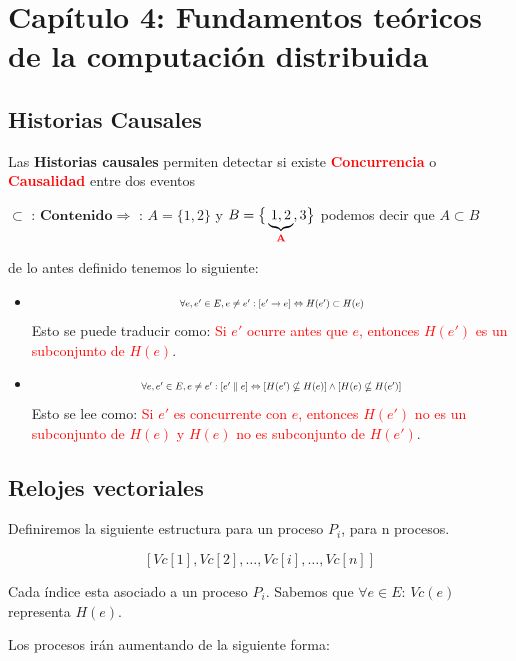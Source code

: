 \section{Capítulo 4: Fundamentos teóricos de la computación distribuida}
\subsection{Historias Causales}
Las \textbf{Historias causales} permiten detectar si existe \textcolor{red}{\textbf{Concurrencia}} o \textcolor{red}{\textbf{Causalidad}} entre dos eventos

{
\tiny\noindent\centering
$\subset \text{ : } \textbf{Contenido} \Rightarrow \text{ : } A=\{1,2\}$ y 
$B=\big\{\underbrace{1,2}_{\text{\textcolor{red}{\textbf{A}}}},3\big\}$ podemos decir que $A \subset B$
\par
}

de lo antes definido tenemos lo siguiente:

\begin{itemize}

    \item 
    \[\textstyle
    \scalebox{0.70}{$\forall e, e' \in E, e \neq e' : [e' \rightarrow e] \Leftrightarrow H(e') \subset H(e)$}
    \]
    Esto se puede traducir como: \textcolor{red}{Si $e'$ ocurre antes que $e$, entonces $H(e')$ es un subconjunto de $H(e)$}.

    \item 
    \[\textstyle
    \scalebox{0.70}{$\forall e, e' \in E, e \neq e' : [e' \parallel e] \Leftrightarrow [H(e') \nsubseteq H(e)] \land [H(e) \nsubseteq H(e') ]$}
    \]
    Esto se lee como: \textcolor{red}{Si $e'$ es concurrente con $e$, entonces $H(e')$ no es un subconjunto de $H(e)$ y $H(e)$ no es subconjunto de $H(e')$}.

\end{itemize}


\subsection{Relojes vectoriales}
Definiremos la siguiente estructura para un proceso $P_i$, para n procesos.

\[\textstyle
   \left[ \mathit{Vc}[1], \mathit{Vc}[2], \dots, \mathit{Vc}[i], \dots, \mathit{Vc}[n] \right]
\]

Cada índice esta asociado a un proceso $P_i$. Sabemos que $\forall e \in E$: $Vc(e)$ representa $H(e)$.

Los procesos irán aumentando de la siguiente forma:

